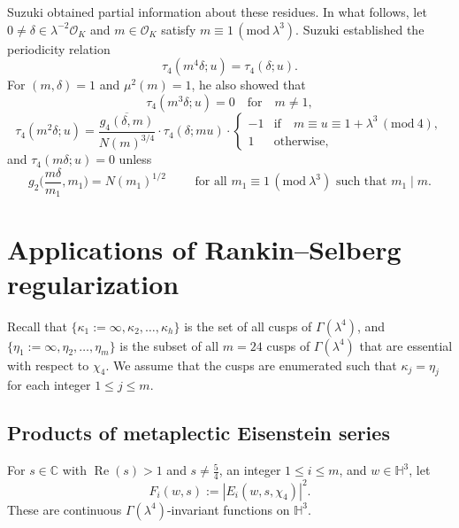 \documentclass[12pt,reqno]{amsart}
\numberwithin{equation}{section}
\renewcommand{\Re}{\operatorname{Re}}
\renewcommand{\pmod}[1]{\, (\mathrm{mod}\ #1)}
\begin{document}
Suzuki \cite{Suz1} obtained partial information about these residues. In what follows, let $0 \neq \delta \in \lambda^{-2}\mathcal{O}_K$ and $m \in \mathcal{O}_K$ satisfy $m \equiv 1 \pmod{\lambda^3}$. Suzuki \cite[Theorem~3]{Suz1} established the periodicity relation
\begin{equation} \label{quartrel}
    \tau_4(m^4 \delta;u)=\tau_4(\delta;u).
\end{equation}
For $(m, \delta) = 1$ and $\mu^2(m)=1$, he also showed \cite[Theorems 4, 5, 6]{Suz1} that
\begin{equation} \label{cuberel}
    \tau_4(m^3 \delta;u)=0 \quad \text{for} \quad m \neq 1,
\end{equation} 
\begin{equation} \label{squarerel}
    \tau_4(m^2 \delta;u)= \frac{\overline{g_4(\delta,m)}}{N(m)^{3/4}} \cdot \tau_4(\delta;mu) \cdot
    \begin{cases}
        -1 & \text{if} \quad m \equiv u \equiv 1+\lambda^3 \pmod{4}, \\
        1 &
        \text{otherwise},
    \end{cases}
\end{equation}
and $\tau_4(m \delta;u) =0$ unless
\begin{equation} \label{linrel2} 
    g_2 \Big(\frac{m \delta}{m_1},m_1 \Big)=N(m_1)^{1/2} \qquad \text{ for all } m_1 \equiv 1 \pmod{\lambda^3} \text{ such that } m_1 \mid m.
\end{equation} 



\section{Applications of Rankin--Selberg regularization}

Recall that $\{\kappa_1:=\infty, \kappa_2, \dots,\kappa_h\}$ is the set of all cusps of $\Gamma(\lambda^4)$, and $\{\eta_1:=\infty, \eta_2, \dots, \eta_m \}$ is the subset of all $m=24$ cusps of $\Gamma(\lambda^4)$ that are essential with respect to $\chi_4$. We assume that the cusps are enumerated such that $\kappa_j = \eta_j$ for each integer $1 \leq j \leq m$.

\subsection{Products of metaplectic Eisenstein series}\label{sec:products_Eis}

For $s \in \mathbb{C}$ with $\Re(s)>1$ and $s \neq \frac{5}{4}$, an integer $1 \leq i \leq m$, and $w \in \mathbb{H}^3$, let 
\begin{equation} \label{Fidef}
F_{i}(w,s):= |E_{i}(w,s,\chi_4)|^2.
\end{equation} 
These are continuous $\Gamma(\lambda^4)$-invariant functions on $\mathbb{H}^3$.
\end{document}
